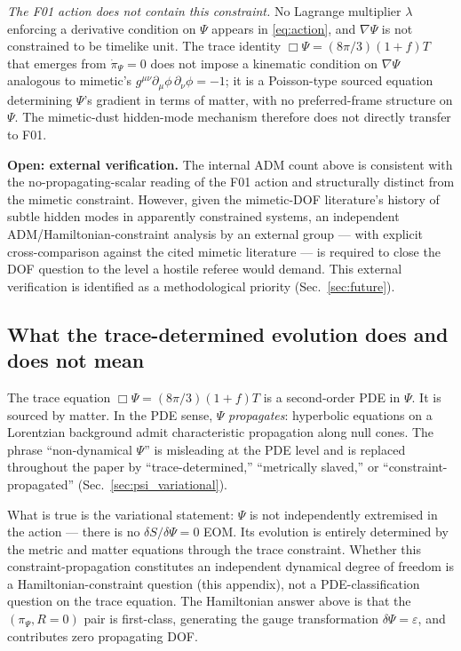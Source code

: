 \documentclass[aps,prd,twocolumn,nofootinbib,floatfix,superscriptaddress]{revtex4-2}
\begin{document}
\emph{The F01 action does not contain this constraint.} No
Lagrange multiplier $\lambda$ enforcing a derivative condition
on $\Psi$ appears in \eqref{eq:action}, and $\nabla\Psi$ is not
constrained to be timelike unit. The trace identity
$\Box\Psi=(8\pi/3)(1+f)T$ that emerges from $\dot\pi_\Psi=0$ does
not impose a kinematic condition on $\nabla\Psi$ analogous to
mimetic's $g^{\mu\nu}\partial_\mu\phi\,\partial_\nu\phi=-1$;
it is a Poisson-type sourced equation determining $\Psi$'s
gradient in terms of matter, with no preferred-frame structure
on $\Psi$. The mimetic-dust hidden-mode mechanism therefore does
not directly transfer to F01.

\textbf{Open: external verification.} The internal ADM count above
is consistent with the no-propagating-scalar reading of the F01
action and structurally distinct from the mimetic constraint.
However, given the mimetic-DOF literature's history of subtle
hidden modes in apparently constrained systems, an independent
ADM/Hamiltonian-constraint analysis by an external group --- with
explicit cross-comparison against the cited mimetic literature ---
is required to close the DOF question to the level a hostile
referee would demand. This external verification is identified
as a methodological priority (Sec.~\ref{sec:future}).

\subsection{What the trace-determined evolution does and does not mean}

The trace equation $\Box\Psi=(8\pi/3)(1+f)T$ is a second-order PDE
in $\Psi$. It is sourced by matter. In the PDE sense, $\Psi$
\emph{propagates}: hyperbolic equations on a Lorentzian background
admit characteristic propagation along null cones. The phrase
``non-dynamical $\Psi$'' is misleading at the PDE level and is
replaced throughout the paper by ``trace-determined,'' ``metrically
slaved,'' or ``constraint-propagated'' (Sec.~\ref{sec:psi_variational}).

What is true is the variational statement: $\Psi$ is not
independently extremised in the action --- there is no
$\delta S/\delta\Psi=0$ EOM. Its evolution is entirely determined
by the metric and matter equations through the trace constraint.
Whether this constraint-propagation constitutes an independent
dynamical degree of freedom is a Hamiltonian-constraint question
(this appendix), not a PDE-classification question on the trace
equation. The Hamiltonian answer above is that the
$(\pi_\Psi,R=0)$ pair is first-class, generating the gauge
transformation $\delta\Psi=\varepsilon$, and contributes zero
propagating DOF.
\end{document}
